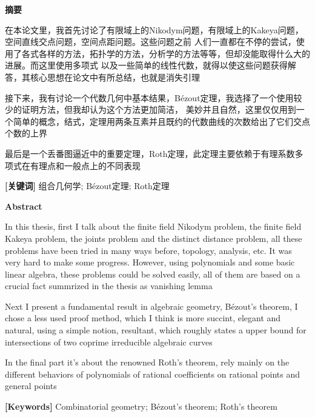 \begin{center}
\textbf{摘要}
\end{center}

在本论文里，我首先讨论了有限域上的Nikodym问题，有限域上的Kakeya问题，空间直线交点问题，空间点距问题\cite{1}。这些问题之前
人们一直都在不停的尝试，使用了各式各样的方法，拓扑学的方法，分析学的方法等等，但却没能取得什么大的进展。而这里使用多项式
以及一些简单的线性代数，就得以使这些问题获得解答，其核心思想在论文中有所总结，也就是消失引理 \par

接下来，我有讨论一个代数几何中基本结果，B\'ezout定理，我选择了一个使用较少的证明方法\cite{2}，但我却认为这个方法更加简洁，
美妙并且自然，这里仅仅用到一个简单的概念，结式，定理用两条互素并且既约的代数曲线的次数给出了它们交点个数的上界 \par

最后是一个丢番图逼近中的重要定理，Roth定理\cite{3}\cite{4}，此定理主要依赖于有理系数多项式在有理点和一般点上的不同表现 \par

\textbf{[关键词]} 组合几何学; B\'ezout定理; Roth定理

\begin{center}
\textbf{Abstract}
\end{center}

In this thesis, first I talk about the finite field Nikodym problem, the finite field Kakeya problem, the 
joints problem and the distinct distance problem\cite{1}, all these problems have been tried in many ways before, 
topology, analysis, etc. It was very hard to make some progress. However, using polynomials and some basic 
linear algebra, these problems could be solved easily, all of them are based on a crucial fact summrized in 
the thesis as vanishing lemma \par

Next I present a fundamental result in algebraic geometry, B\'ezout's theorem\cite{2}, I chose a less used proof 
method, which I think is more succint, elegant and natural, using a simple notion, resultant, which roughly 
states a upper bound for intersections of two coprime irreducible algebraic curves \par

In the final part it's about the renowned Roth's theorem\cite{3}\cite{4}, rely mainly on the different behaviors of 
polynomials of rational coefficients on rational points and general points

\textbf{[Keywords]} Combinatorial geometry; B\'ezout's theorem; Roth's theorem